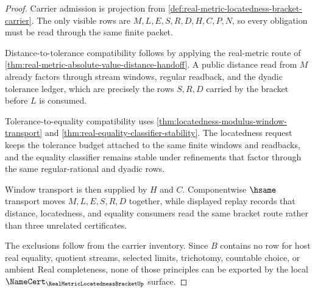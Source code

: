 \begin{proof}
Carrier admission is projection from \autoref{def:real-metric-locatedness-bracket-carrier}. The only visible rows are $M,L,E,S,R,D,H,C,P,N$, so every obligation must be read through the same finite packet.

Distance-to-tolerance compatibility follows by applying the real-metric route of \autoref{thm:real-metric-absolute-value-distance-handoff}. A public distance read from $M$ already factors through stream windows, regular readback, and the dyadic tolerance ledger, which are precisely the rows $S,R,D$ carried by the bracket before $L$ is consumed.

Tolerance-to-equality compatibility uses \autoref{thm:locatedness-modulus-window-transport} and \autoref{thm:real-equality-classifier-stability}. The locatedness request keeps the tolerance budget attached to the same finite windows and readbacks, and the equality classifier remains stable under refinements that factor through the same regular-rational and dyadic rows.

Window transport is then supplied by $H$ and $C$. Componentwise $\hsame$ transport moves $M,L,E,S,R,D$ together, while displayed replay records that distance, locatedness, and equality consumers read the same bracket route rather than three unrelated certificates.

The exclusions follow from the carrier inventory. Since $B$ contains no row for host real equality, quotient streams, selected limits, trichotomy, countable choice, or ambient Real completeness, none of those principles can be exported by the local $\NameCert_{\RealMetricLocatednessBracketUp}$ surface.
\end{proof}

